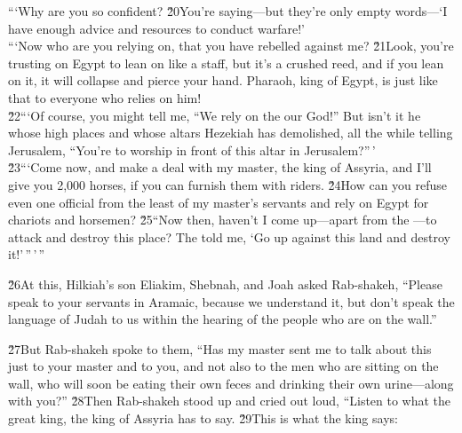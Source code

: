 \begin{poetry}
\poeml ```Why are you so confident? \v{20}You're saying---but they're only empty words---`I have enough advice and resources to conduct warfare!' \\
\poeml ```Now who are you relying on, that you have rebelled against me? \v{21}Look, you're trusting on Egypt to lean on like a staff, but it's a crushed reed, and if you lean on it, it will collapse and pierce your hand. Pharaoh, king of Egypt, is just like that to everyone who relies on him! \\
\poeml \v{22}```Of course, you might tell me, ``We rely on the  our God!'' But isn't it he whose high places and whose altars Hezekiah has demolished, all the while telling Jerusalem, ``You're to worship in front of this altar in Jerusalem?''\,' \\
\poeml \v{23}```Come now, and make a deal with my master, the king of Assyria, and I'll give you 2,000 horses, if you can furnish them with riders. \v{24}How can you refuse even one official from the least of my master's servants and rely on Egypt for chariots and horsemen? \v{25}``Now then, haven't I come up---apart from the ---to attack and destroy this place? The  told me, `Go up against this land and destroy it!'\,''\,'\,''
\end{poetry}

\v{26}At this, Hilkiah's son Eliakim, Shebnah, and Joah asked Rab-shakeh, ``Please speak to your servants in Aramaic, because we understand it, but don't speak the language of Judah to us within the hearing of the people who are on the wall.''

\v{27}But Rab-shakeh spoke to them, ``Has my master sent me to talk about this just to your master and to you, and not also to the men who are sitting on the wall, who will soon be eating their own feces and drinking their own urine---along with you?'' \v{28}Then Rab-shakeh stood up and cried out loud, ``Listen to what the great king, the king of Assyria has to say. \v{29}This is what the king says:

